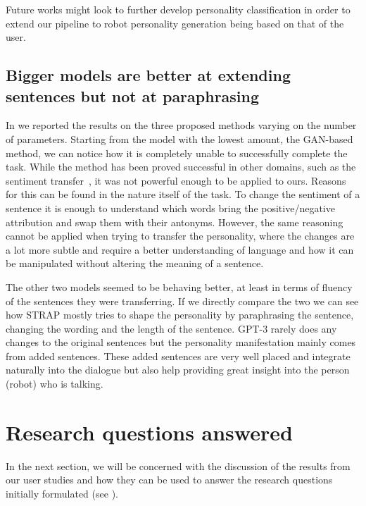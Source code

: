 \documentclass[nomenclature, english, biblatex]{kththesis}
\begin{document}
Future works might look to further develop personality classification in order to extend our pipeline to robot personality generation being based on that of the user.
\subsection{Bigger models are better at extending sentences but not at paraphrasing}
In  we reported the results on the three proposed methods varying on the number of parameters. Starting from the model with the lowest amount, the GAN-based method, we can notice how it is completely unable to successfully complete the task. While the method has been proved successful in other domains, such as the sentiment transfer~\cite{yang2018unsupervised}, it was not powerful enough to be applied to ours. Reasons for this can be found in the nature itself of the task. To change the sentiment of a sentence it is enough to understand which words bring the positive/negative attribution and swap them with their antonyms. However, the same reasoning cannot be applied when trying to transfer the personality, where the changes are a lot more subtle and require a better understanding of language and how it can be manipulated without altering the meaning of a sentence.

The other two models seemed to be behaving better, at least in terms of fluency of the sentences they were transferring. If we directly compare the two we can see how STRAP mostly tries to shape the personality by paraphrasing the sentence, changing the wording and the length of the sentence. GPT-3 rarely does any changes to the original sentences but the personality manifestation mainly comes from added sentences. These added sentences are very well placed and integrate naturally into the dialogue but also help providing great insight into the person (robot) who is talking.

\section{Research questions answered}
In the next section, we will be concerned with the discussion of the results from our user studies and how they can be used to answer the research questions initially formulated (see ).
\end{document}

